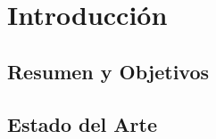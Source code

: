 \documentclass[../../main.tex]{subfiles}
\begin{document}
		
	\chapter[Introducción]{Introducción}
	\section[Resumen]{Resumen y Objetivos}	
	\lipsum[3-5]
	\section[Estado del Arte]{Estado del Arte}
	\lipsum[7-9]
	\newpage
\end{document}
